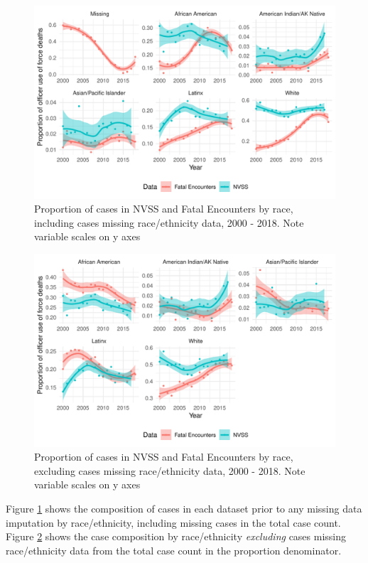 \documentclass{article}
\begin{document}
\begin{figure}
	\centering
	\includegraphics[width = \linewidth]{vis/fe_nvss_race_compare.pdf}
	\caption{Proportion of cases in NVSS and Fatal Encounters by race, including cases missing race/ethnicity data, 2000 - 2018. Note variable scales on y axes}
	\label{fig:compare_missing}
\end{figure}

\begin{figure}
	\centering
	\includegraphics[width = \linewidth]{vis/fe_nvss_race_compare_na_rm.pdf}
	\caption{Proportion of cases in NVSS and Fatal Encounters by race, excluding cases missing race/ethnicity data, 2000 - 2018. Note variable scales on y axes}
	\label{fig:compare_missing_na_rm}
\end{figure}

Figure \ref{fig:compare_missing} shows the composition of cases in each dataset prior to any missing data imputation by race/ethnicity, including missing cases in the total case count. Figure \ref{fig:compare_missing_na_rm} shows the case composition by race/ethnicity \textit{excluding} cases missing race/ethnicity data from the total case count in the proportion denominator. 
\end{document}
